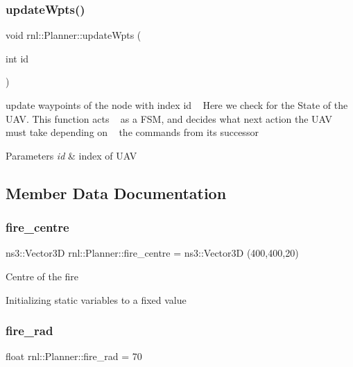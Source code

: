 \subsubsection{\texorpdfstring{update\+Wpts()}{updateWpts()}}
{\footnotesize\ttfamily void rnl\+::\+Planner\+::update\+Wpts (\begin{DoxyParamCaption}\item[{int}]{id }\end{DoxyParamCaption})}



update waypoints of the node with index id ~\newline
Here we check for the State of the U\+AV. This function acts ~\newline
as a F\+SM, and decides what next action the U\+AV must take depending on ~\newline
the commands from its successor 


\begin{DoxyParams}{Parameters}
{\em id} & index of U\+AV \\
\hline
\end{DoxyParams}


\subsection{Member Data Documentation}
\mbox{\label{classrnl_1_1Planner_a12c02257f8ca2e08030a6469d985bf83}} 
\subsubsection{\texorpdfstring{fire\+\_\+centre}{fire\_centre}}
{\footnotesize\ttfamily ns3\+::\+Vector3D rnl\+::\+Planner\+::fire\+\_\+centre = ns3\+::\+Vector3D (400,400,20)\hspace{0.3cm}{\ttfamily [static]}}

Centre of the fire

Initializing static variables to a fixed value \mbox{\label{classrnl_1_1Planner_a97417a218c9ff97822d71b1a26075263}} 
\subsubsection{\texorpdfstring{fire\+\_\+rad}{fire\_rad}}
{\footnotesize\ttfamily float rnl\+::\+Planner\+::fire\+\_\+rad = 70\hspace{0.3cm}{\ttfamily [static]}}

